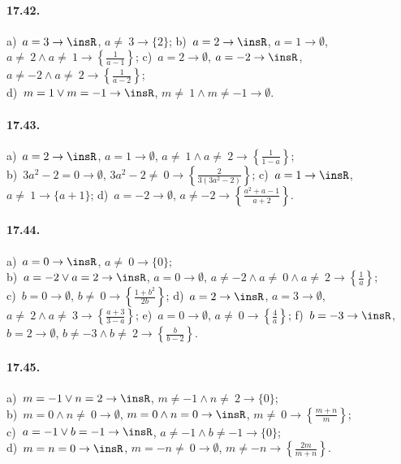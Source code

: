 \paragraph{17.42.}
a)~$a=3 \rightarrow \insR$, $a\neq~3 \rightarrow \{2\}$;
\quad b)~$a=2 \rightarrow \insR$, $a=1 \rightarrow \emptyset$, $a\neq~2\wedge a\neq~1 \rightarrow \left\{\frac{1}{a-1}\right\}$;
\quad c)~$a=2 \rightarrow \emptyset$, $a=-2 \rightarrow \insR$, $a\neq -2\wedge a\neq~2 \rightarrow \left\{\frac{1}{a-2}\right\}$;
\quad\protect\\
d)~$m=1\vee m=-1 \rightarrow \insR$, $m\neq~1\wedge m\neq -1 \rightarrow \emptyset$.

\paragraph{17.43.}
a)~$a=2 \rightarrow \insR$, $a=1 \rightarrow \emptyset$, $a\neq~1\wedge a\neq~2 \rightarrow \left\{\frac{1}{1-a}\right\}$;
\quad\protect\\
b)~$3a^{2}-2=0 \rightarrow \emptyset$, $3a^{2}-2\neq~0 \rightarrow \left\{\frac{2}{3(3a^{2}-2)}\right\}$;
\quad c)~$a=1 \rightarrow \insR$, $a\neq~1 \rightarrow \{a+1\}$;
\quad d)~$a=-2 \rightarrow \emptyset$, $a\neq -2 \rightarrow \left\{\frac{a^{2}+a-1}{a+2}\right\}$.

\paragraph{17.44.}
a)~$a=0 \rightarrow \insR$, $a\neq~0 \rightarrow \{0\}$;
\quad \protect\\
b)~$a=-2\vee a=2 \rightarrow \insR$, $a=0 \rightarrow \emptyset$, $a\neq -2\wedge a\neq~0\wedge a\neq~2 \rightarrow \left\{\frac{1}{a}\right\}$;
\quad\protect\\
c)~$b=0 \rightarrow \emptyset$, $b\neq~0 \rightarrow \left\{\frac{1+b^{2}}{2b}\right\}$;
\quad d)~$a=2 \rightarrow \insR$, $a=3 \rightarrow \emptyset$, $a\neq~2\wedge a\neq~3 \rightarrow \left\{\frac{a+3}{3-a}\right\}$;
\quad e)~$a=0 \rightarrow \emptyset$, $a\neq~0 \rightarrow \left\{\frac{4}{a}\right\}$;
\quad f)~$b=-3 \rightarrow \insR$, $b=2 \rightarrow \emptyset$, $b\neq -3\wedge b\neq~2 \rightarrow \left\{\frac{b}{b-2}\right\}$.

\paragraph{17.45.}
a)~$m=-1\vee n=2 \rightarrow \insR$, $m\neq -1\wedge n\neq~2 \rightarrow \{0\}$;
\protect\\
b)~$m=0\wedge n\neq~0 \rightarrow \emptyset$, $m=0\wedge n=0 \rightarrow \insR$, $m\neq~0 \rightarrow \left\{\frac{m+n}{m}\right\}$;
\protect\\
c)~$a=-1\vee b=-1 \rightarrow \insR$, $a\neq -1\wedge b\neq -1 \rightarrow \{0\}$;
\protect\\ d)~$m=n=0 \rightarrow \insR$, $m=-n\neq~0 \rightarrow \emptyset$, $m\neq -n \rightarrow \left\{\frac{2m}{m+n}\right\}$.

